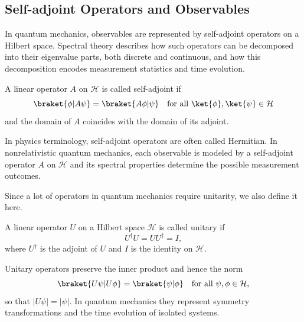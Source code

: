 \subsection{Self-adjoint Operators and Observables}\label{sec:self_adjoint_operators_and_observables}
In quantum mechanics, observables are represented by self-adjoint operators on a Hilbert space. Spectral theory describes how such operators can be decomposed into their eigenvalue parts, both discrete and continuous, and how this decomposition encodes measurement statistics and time evolution.
\begin{definition}
A linear operator $A$ on $\mathcal{H}$ is called self-adjoint if
\begin{equation}
\braket{\phi|A\psi}=\braket{A\phi|\psi}\quad\text{for all }\ket{\phi},\ket{\psi}\in\mathcal{H}
\end{equation}
and the domain of $A$ coincides with the domain of its adjoint.
\end{definition}
In physics terminology, self-adjoint operators are often called Hermitian. In nonrelativistic quantum mechanics, each observable is modeled by a self-adjoint operator $A$ on $\mathcal{H}$ and its spectral properties determine the possible measurement outcomes.

Since a lot of operators in quantum mechanics require unitarity, we also define it here.
\begin{definition}
A linear operator $U$ on a Hilbert space $\mathcal{H}$ is called unitary if
\begin{equation}
U^\dagger U=U U^\dagger=I,
\end{equation}
where $U^\dagger$ is the adjoint of $U$ and $I$ is the identity on $\mathcal{H}$.
\end{definition}
Unitary operators preserve the inner product and hence the norm
\begin{equation}
\braket{U\psi\vert U\phi}=\braket{\psi\vert\phi}\quad\text{for all }\psi,\phi\in\mathcal{H},
\end{equation}
so that $\lvert U\psi\rvert=\lvert\psi\rvert$. In quantum mechanics they represent symmetry
transformations and the time evolution of isolated systems.

